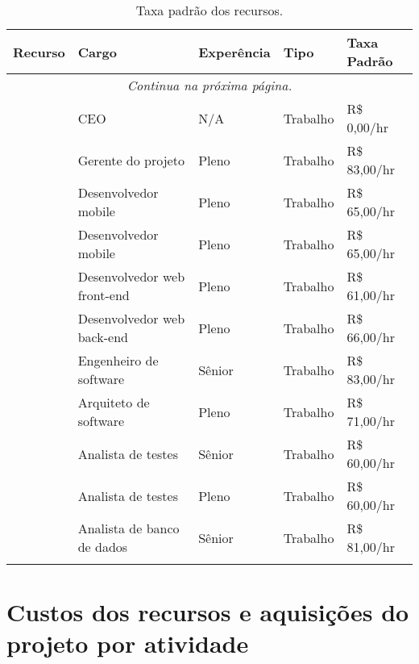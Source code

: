 \begin{longtable}{ p{} p{} l l l }
	\toprule
	\textbf{Recurso}      & \textbf{Cargo}              & \textbf{Experência} & \textbf{Tipo} & \textbf{Taxa Padrão} \\
	\midrule
	\endhead
	\multicolumn{5}{c}{{\textit{Continua na próxima página.}}} \\
	\caption{Taxa padrão dos recursos.}
	\endfoot
	\endlastfoot
	\ceoName{}            & CEO                         & N/A                  & Trabalho      & R\$ 0,00/hr           \\
	\midrule
	\projectManagerName{} & Gerente do projeto          & Pleno                & Trabalho      & R\$ 83,00/hr          \\
	\midrule
	\mobDevOneName{}      & Desenvolvedor mobile        & Pleno                & Trabalho      & R\$ 65,00/hr          \\
	\midrule
	\mobDevTwoName{}      & Desenvolvedor mobile        & Pleno                & Trabalho      & R\$ 65,00/hr          \\
	\midrule
	\frontWebDevName{}    & Desenvolvedor web front-end & Pleno                & Trabalho      & R\$ 61,00/hr          \\
	\midrule
	\backWebDevName{}     & Desenvolvedor web back-end  & Pleno                & Trabalho      & R\$ 66,00/hr          \\
	\midrule
	\softEngName{}        & Engenheiro de software      & Sênior              & Trabalho      & R\$ 83,00/hr          \\
	\midrule
	\softArcName{}        & Arquiteto de software       & Pleno                & Trabalho      & R\$ 71,00/hr          \\
	\midrule
	\testAnalOneName{}    & Analista de testes          & Sênior              & Trabalho      & R\$ 60,00/hr          \\
	\midrule
	\testAnalTwoName{}    & Analista de testes          & Pleno                & Trabalho      & R\$ 60,00/hr          \\
	\midrule
	\dbAnalName{}         & Analista de banco de dados  & Sênior              & Trabalho      & R\$ 81,00/hr          \\
	\bottomrule
	\caption{Taxa padrão dos recursos.}
	\centering
\end{longtable}

\section{Custos dos recursos e aquisições do projeto por atividade}

